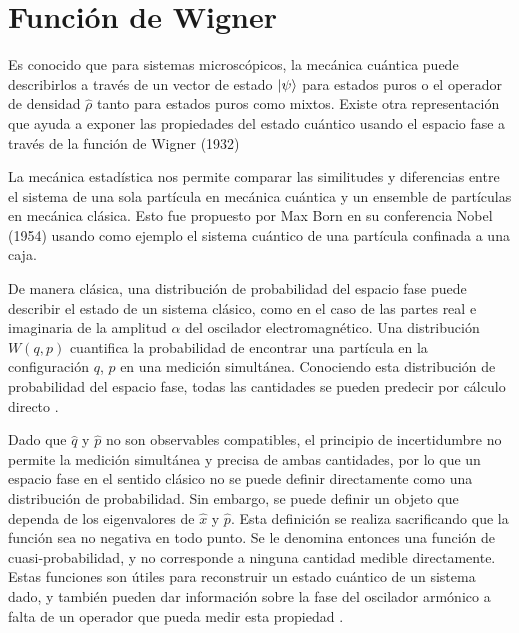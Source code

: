 \chapter{Función de Wigner}

Es conocido que para sistemas microscópicos, la mecánica cuántica puede describirlos a través de un vector de estado $\ket{\psi}$ para estados puros o el operador de densidad $\hat{\rho}$ tanto para estados puros como mixtos. Existe otra representación que ayuda a exponer las propiedades del estado cuántico usando el espacio fase a través de la función de Wigner (1932)

La mecánica estadística nos permite comparar las similitudes y diferencias entre el sistema de una sola partícula en mecánica cuántica y un ensemble de partículas en mecánica clásica. Esto fue propuesto por Max Born en su conferencia Nobel (1954) usando como ejemplo el sistema cuántico de una partícula confinada a una caja.

De manera clásica, una distribución de probabilidad del espacio fase puede describir el estado de un sistema clásico, como en el caso de las partes real e imaginaria de la amplitud $\alpha$ del oscilador electromagnético. Una distribución $W(q,p)$ cuantifica la probabilidad de encontrar una partícula en la configuración $q$, $p$ en una medición simultánea. Conociendo esta distribución de probabilidad del espacio fase, todas las cantidades se pueden predecir por cálculo directo \cite{Leonhardt}.

Dado que $\hat{q}$ y $\hat{p}$ no son observables compatibles, el principio de incertidumbre no permite la medición simultánea y precisa de ambas cantidades, por lo que un espacio fase en el sentido clásico no se puede definir directamente como una distribución de probabilidad. Sin embargo, se puede definir un objeto que dependa de los eigenvalores de $\hat{x}$ y $\hat{p}$. Esta definición se realiza sacrificando que la función sea no negativa en todo punto. Se le denomina entonces una función de cuasi-probabilidad, y no corresponde a ninguna cantidad medible directamente. Estas funciones son útiles para reconstruir un estado cuántico de un sistema dado, y también pueden dar información sobre la fase del oscilador armónico a falta de un operador que pueda medir esta propiedad \cite{Moya}.

